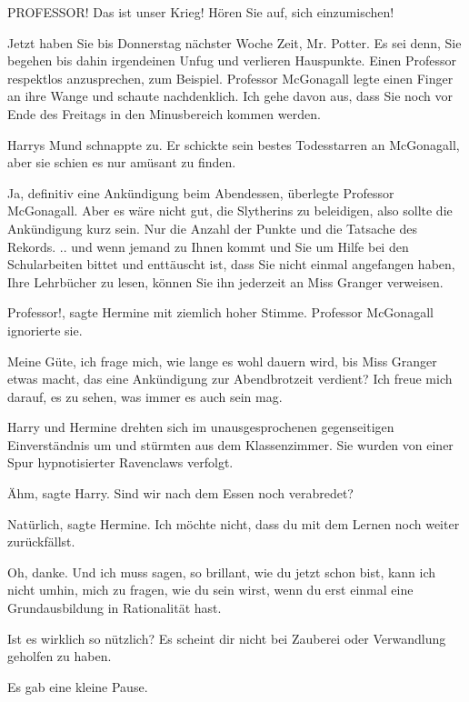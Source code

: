 \glqq PROFESSOR! Das ist unser Krieg! Hören Sie auf, sich einzumischen!\grqq{}

\glqq Jetzt haben Sie bis Donnerstag nächster Woche Zeit, Mr. Potter. Es sei
denn, Sie begehen bis dahin irgendeinen Unfug und verlieren Hauspunkte. Einen
Professor respektlos anzusprechen, zum Beispiel.\grqq{} Professor McGonagall
legte einen Finger an ihre Wange und schaute nachdenklich. \glqq Ich gehe davon
aus, dass Sie noch vor Ende des Freitags in den Minusbereich kommen
werden.\grqq{}

Harrys Mund schnappte zu. Er schickte sein bestes Todesstarren an McGonagall,
aber sie schien es nur amüsant zu finden.

\glqq Ja, definitiv eine Ankündigung beim Abendessen\grqq{}, überlegte
Professor McGonagall. \glqq Aber es wäre nicht gut, die Slytherins zu
beleidigen, also sollte die Ankündigung kurz sein. Nur die Anzahl der Punkte und
die Tatsache des Rekords. .. und wenn jemand zu Ihnen kommt und Sie um Hilfe bei
den Schularbeiten bittet und enttäuscht ist, dass Sie nicht einmal angefangen
haben, Ihre Lehrbücher zu lesen, können Sie ihn jederzeit an Miss Granger
verweisen.\grqq{}

\glqq Professor!\grqq{}, sagte Hermine mit ziemlich hoher Stimme. Professor
McGonagall ignorierte sie.

\glqq Meine Güte, ich frage mich, wie lange es wohl dauern wird, bis Miss
Granger etwas macht, das eine Ankündigung zur Abendbrotzeit verdient? Ich freue
mich darauf, es zu sehen, was immer es auch sein mag.\grqq{}

Harry und Hermine drehten sich im unausgesprochenen gegenseitigen Einverständnis
um und stürmten aus dem Klassenzimmer. Sie wurden von einer Spur hypnotisierter
Ravenclaws verfolgt.

\glqq Ähm\grqq{}, sagte Harry. \glqq Sind wir nach dem Essen noch
verabredet?\grqq{}

\glqq Natürlich\grqq{}, sagte Hermine. \glqq Ich möchte nicht, dass du mit dem
Lernen noch weiter zurückfällst.\grqq{}

\glqq Oh, danke. Und ich muss sagen, so brillant, wie du jetzt schon bist, kann
ich nicht umhin, mich zu fragen, wie du sein wirst, wenn du erst einmal eine
Grundausbildung in Rationalität hast.\grqq{}

\glqq Ist es wirklich so nützlich? Es scheint dir nicht bei Zauberei oder
Verwandlung geholfen zu haben.\grqq{}

Es gab eine kleine Pause.

